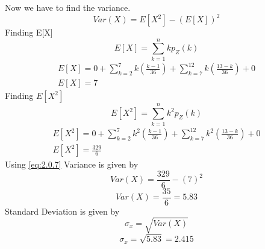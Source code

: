 \documentclass[journal,12pt,twocolumn]{IEEEtran}
\begin{document}
    Now we have to find the variance.
\begin{equation}\label{eq:2.0.7}
     Var(X) = E[X^2] - (E[X])^2
\end{equation}
Finding E[X]
\begin{equation}\label{eq:2.0.8}
    E[X] = \sum_{k=1}^{n} k p_Z(k)
\end{equation}
    \begin{equation}\label{eq:2.0.9}
    \begin{split}
         E[X] = 0 +  \sum_{k=2}^{7} k\left(\frac{k-1}{36}\right) + \sum_{k=7}^{12} k\left(\frac{13-k}{36}\right) + 0\\
         E[X]  = 7
    \end{split}
    \end{equation}
   Finding $E[X^2]$
\begin{equation}\label{eq:2.0.10}
    E[X^2] = \sum_{k=1}^{n} k^2 p_Z(k)
\end{equation}
     \begin{equation}\label{eq:2.0.11}
    \begin{split}
         E[X^2] = 0 +  \sum_{k=2}^{7} k^2\left(\frac{k-1}{36}\right) + \sum_{k=7}^{12} k^2\left(\frac{13-k}{36}\right) + 0\\
         E[X^2]  = \frac{329}{6}
    \end{split}
    \end{equation}
    Using \eqref{eq:2.0.7} Variance is given by \\
\begin{equation*}
    Var(X) = \frac{329}{6} - (7)^2
\end{equation*}
\begin{equation*}
    Var(X) = \frac{35}{6} = 5.83
\end{equation*}
Standard Deviation is given by
\begin{equation}\label{eq:2.0.12}
    \sigma_x = \sqrt{Var(X)} 
\end{equation}
\begin{equation*}
    \sigma_x  = \sqrt{5.83} = 2.415
\end{equation*}
    
\end{document}
